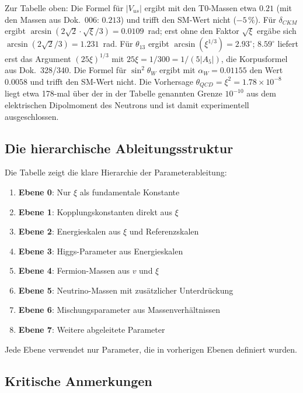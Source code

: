	Zur Tabelle oben: Die Formel für $|V_{us}|$ ergibt mit den T0-Massen etwa $0.21$ (mit den Massen aus Dok.~006: $0.213$) und trifft den SM-Wert nicht ($-5\,\%$). Für $\delta_{CKM}$ ergibt $\arcsin(2\sqrt2\cdot\sqrt{\xi}/3) = 0.0109$~rad; erst ohne den Faktor $\sqrt{\xi}$ ergäbe sich $\arcsin(2\sqrt2/3) = 1.231$~rad. Für $\theta_{13}$ ergibt $\arcsin(\xi^{1/3}) = 2.93^\circ$; $8.59^\circ$ liefert erst das Argument $(25\xi)^{1/3}$ mit $25\xi = 1/300 = 1/(5|A_5|)$, die Korpusformel aus Dok.~328/340. Die Formel für $\sin^2\theta_W$ ergibt mit $\alpha_W = 0.01155$ den Wert $0.0058$ und trifft den SM-Wert nicht. Die Vorhersage $\theta_{QCD} = \xi^2 = 1.78 \times 10^{-8}$ liegt etwa 178-mal über der in der Tabelle genannten Grenze $10^{-10}$ aus dem elektrischen Dipolmoment des Neutrons und ist damit experimentell ausgeschlossen.

\subsection{Die hierarchische Ableitungsstruktur}
\label{subsec:hierarchical_structure}

Die Tabelle zeigt die klare Hierarchie der Parameterableitung:

\begin{enumerate}
	\item \textbf{Ebene 0}: Nur $\xi$ als fundamentale Konstante
	\item \textbf{Ebene 1}: Kopplungskonstanten direkt aus $\xi$
	\item \textbf{Ebene 2}: Energieskalen aus $\xi$ und Referenzskalen
	\item \textbf{Ebene 3}: Higgs-Parameter aus Energieskalen
	\item \textbf{Ebene 4}: Fermion-Massen aus $v$ und $\xi$
	\item \textbf{Ebene 5}: Neutrino-Massen mit zusätzlicher Unterdrückung
	\item \textbf{Ebene 6}: Mischungsparameter aus Massenverhältnissen
	\item \textbf{Ebene 7}: Weitere abgeleitete Parameter
\end{enumerate}

Jede Ebene verwendet nur Parameter, die in vorherigen Ebenen definiert wurden.

\subsection{Kritische Anmerkungen}
\label{subsec:critical_notes}

